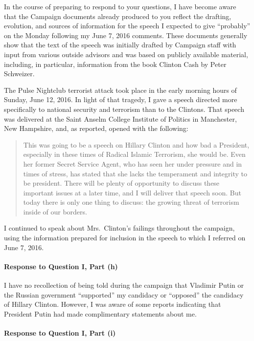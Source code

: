 In the course of preparing to respond to your questions, I have become aware that the Campaign documents already produced to you reflect the drafting, evolution, and sources of information for the speech I expected to give “probably” on the Monday following my June 7, 2016 comments.
These documents generally show that the text of the speech was initially drafted by Campaign staff with input from various outside advisors and was based on publicly available material, including, in particular, information from the book Clinton Cash by Peter Schweizer.

The Pulse Nightclub terrorist attack took place in the early morning hours of Sunday, June 12, 2016.
In light of that tragedy, I gave a speech directed more specifically to national security and terrorism than to the Clintons.
That speech was delivered at the Saint Anselm College Institute of Politics in Manchester, New Hampshire, and, as reported, opened with the following:

\begin{quote}
This was going to be a speech on Hillary Clinton and how bad a President, especially in these times of Radical Islamic Terrorism, she would be.
Even her former Secret Service Agent, who has seen her under pressure and in times of stress, has stated that she lacks the temperament and integrity to be president.
There will be plenty of opportunity to discuss these important issues at a later time, and I will deliver that speech soon.
But today there is only one thing to discuss: the growing threat of terrorism inside of our borders.
\end{quote}

I continued to speak about Mrs.~Clinton’s failings throughout the campaign, using the information prepared for inclusion in the speech to which I referred on June 7, 2016.

\paragraph*{Response to Question I, Part (h)}

I have no recollection of being told during the campaign that Vladimir Putin or the Russian government “supported” my candidacy or “opposed” the candidacy of Hillary Clinton.
However, I was aware of some reports indicating that President Putin had made complimentary statements about me.

\paragraph*{Response to Question I, Part (i)}

